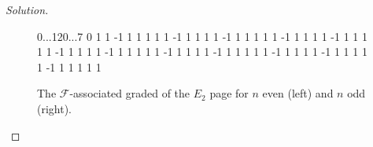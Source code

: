 \documentclass{amsart}
\def\Filt{\mathcal{F}}
\begin{document}
\begin{proof}[Solution]
\begin{figure}
\begin{sseq}[entrysize=5mm, gridstroke=.05pt, xlabels={-n; ; ;; ; ; ; ; ;; ; ; -n+12}]{0...12}{0...7}
 0
\ssdropbull
{} 1
\ssdropbull \ssstroke
{} 1
\ssdropbull \ssstroke
{} {-1}
\ssdropbull \ssstroke
{} 1
\ssdropbull \ssstroke
{} 1
\ssdropbull \ssstroke
{} 1
\ssdropbull
{} 1
\ssdropbull \ssstroke
{} 1
\ssdropbull \ssstroke
{} {-1}
\ssdropbull \ssstroke
{} 1
\ssdropbull \ssstroke
{} 1
\ssdropbull \ssstroke
{}
\ssdropbull
{} 1
\ssdropbull \ssstroke
{} 1
\ssdropbull \ssstroke
{} {-1}
\ssdropbull \ssstroke
{} 1
\ssdropbull \ssstroke
{} 1
\ssdropbull \ssstroke
{} 1
\ssdropbull
{} 1
\ssdropbull \ssstroke
{} 1
\ssdropbull \ssstroke
{} {-1}
\ssdropbull \ssstroke
{} 1
\ssdropbull \ssstroke
{} 1
\ssdropbull \ssstroke
{}
\ssdropbull
{} 1
\ssdropbull \ssstroke
{} 1
\ssdropbull \ssstroke
{} {-1}
\ssdropbull \ssstroke
{} 1
\ssdropbull \ssstroke
{} 1
\ssdropbull \ssstroke
{} 1
\ssdropbull
{} 1
\ssdropbull \ssstroke
{} 1
\ssdropbull \ssstroke
{} {-1}
\ssdropbull \ssstroke
{} 1
\ssdropbull \ssstroke
{} 1
\ssdropbull \ssstroke
{}
\ssdropbull
{} 1
\ssdropbull \ssstroke
{} 1
\ssdropbull \ssstroke
{} {-1}
\ssdropbull \ssstroke
{} 1
\ssdropbull \ssstroke
{} 1
\ssdropbull \ssstroke
{} 1
\ssdropbull
{} 1
\ssdropbull \ssstroke
{} 1
\ssdropbull \ssstroke
{} {-1}
\ssdropbull \ssstroke
{} 1
\ssdropbull \ssstroke
{} 1
\ssdropbull \ssstroke
{}
\ssdropbull
{} 1
\ssdropbull \ssstroke
{} 1
\ssdropbull \ssstroke
{} {-1}
\ssdropbull \ssstroke
{} 1
\ssdropbull \ssstroke
{} 1
\ssdropbull \ssstroke
{} 1
\ssdropbull
{} 1
\ssdropbull \ssstroke
{} 1
\ssdropbull \ssstroke
{} {-1}
\ssdropbull \ssstroke
{} 1
\ssdropbull \ssstroke
{} 1
\ssdropbull \ssstroke
{}
\ssdropbull
{} 1
\ssdropbull \ssstroke
{} 1
\ssdropbull \ssstroke
{} {-1}
\ssdropbull \ssstroke
{} 1
\ssdropbull \ssstroke
{} 1
\ssdropbull \ssstroke
{} 1
\ssdropbull
{} 1
\ssdropbull \ssstroke
{} 1
\ssdropbull \ssstroke
{} {-1}
\ssdropbull \ssstroke
{} 1
\ssdropbull \ssstroke
{} 1
\ssdropbull \ssstroke
{}
\ssdropbull
{} 1
\ssdropbull \ssstroke
{} 1
\ssdropbull
{} 1
\ssdropbull
\end{sseq}
\caption{The $\Filt$-associated graded of the $E_2$ page for $n$ even (left) and $n$ odd (right).}
\label{fig:Filt}
\end{figure}



\end{proof}
\end{document}
